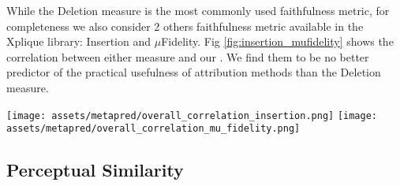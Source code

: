 While the Deletion\cite{petsiuk2018rise} measure is the most commonly used faithfulness metric, for completeness we also consider 2 others faithfulness metric available in the Xplique library\cite{fel2022xplique}: Insertion\cite{petsiuk2018rise} and $\mu$Fidelity\cite{aggregating2020}. 
Fig \ref{fig:insertion_mufidelity} shows the correlation between either measure and our \metric. We find them to be no better predictor of the practical usefulness of attribution methods than the Deletion measure. \\

\begin{figure*}[h]
    \texttt{[image: assets/metapred/overall\_correlation\_insertion.png]}
    \texttt{[image: assets/metapred/overall\_correlation\_mu\_fidelity.png]}
    \caption{\textbf{\metric~vs Insertion correlation \& \metric~vs $\mu$Fidelity correlation}
        The results suggest that every faithfulness metrics tested are poor predictors of the practical usefulness of attribution methods. 
        Concerning the ImageNet dataset (triangle marker), the \metric~scores are insignificant since none of the methods improves the baseline.
        }
    \label{fig:insertion_mufidelity}
    \vspace{-4mm}
\end{figure*}



\subsection{Perceptual Similarity}

